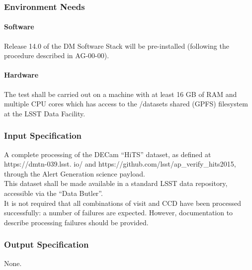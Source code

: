 \subsubsection{Environment Needs}

\paragraph{Software}
Release 14.0 of the DM Software Stack will be pre-installed (following
the procedure described in AG-00-00).


\paragraph{Hardware}
The test shall be carried out on a machine with at least 16 GB of RAM
and multiple CPU cores which has access to the /datasets shared (GPFS)
filesystem at the LSST Data Facility.


\subsubsection{Input Specification}
A complete processing of the DECam ``HiTS'' dataset, as defined at
https://dmtn-039.lsst. io/ and
https://github.com/lsst/ap\_verify\_hits2015, through the Alert
Generation science payload.\\
This dataset shall be made available in a standard LSST data repository,
accessible via the ``Data Butler''.\\
It is not required that all combinations of visit and CCD have been
processed successfully: a number of failures are expected. However,
documentation to describe processing failures should be provided.


\subsubsection{Output Specification}
None.


